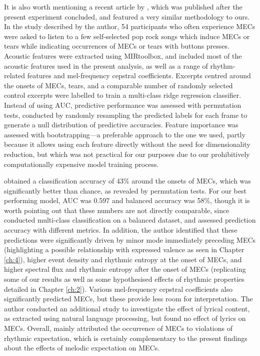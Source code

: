 It is also worth mentioning a recent article by \textcite{mori2022}, which was published after the present experiment concluded, and featured a very similar methodology to ours. In the study described by the author, 54 participants who often experience MECs were asked to listen to a few self-selected pop rock songs which induce MECs or tears while indicating occurrences of MECs or tears with buttons presses. Acoustic features were extracted using MIRtoolbox, and included most of the acoustic features used in the present analysis, as well as a range of rhythm-related features and mel-frequency cepstral coefficients. Excerpts centred around the onsets of MECs, tears, and a comparable number of randomly selected control excerpts were labelled to train a multi-class ridge regression classifier. Instead of using AUC, predictive performance was assessed with permutation tests, conducted by randomly resampling the predicted labels for each frame to generate a null distribution of predictive accuracies. Feature importance was assessed with bootstrapping---a preferable approach to the one we used, partly because it allows using each feature directly without the need for dimensionality reduction, but which was not practical for our purposes due to our prohibitively computationally expensive model training process.

\textcite{mori2022} obtained a classification accuracy of 43\% around the onsets of MECs, which was significantly better than chance, as revealed by permutation tests. For our best performing model, AUC was 0.597 and balanced accuracy was 58\%, though it is worth pointing out that these numbers are not directly comparable, since \textcite{mori2022} conducted multi-class classification on a balanced dataset, and assessed prediction accuracy with different metrics. In addition, the author identified that these predictions were significantly driven by minor mode immediately preceding MECs (highlighting a possible relationship with expressed valence as seen in Chapter \ref{ch:4}), higher event density and rhythmic entropy at the onset of MECs, and higher spectral flux and rhythmic entropy after the onset of MECs (replicating some of our results as well as some hypothesised effects of rhythmic properties detailed in Chapter \ref{ch:2}). Various mel-frequency cepstral coefficients also significantly predicted MECs, but these provide less room for interpretation. The author conducted an additional study to investigate the effect of lyrical content, as extracted using natural language processing, but found no effect of lyrics on MECs. Overall, \textcite{mori2022} mainly attributed the occurrence of MECs to violations of rhythmic expectation, which is certainly complementary to the present findings about the effects of melodic expectation on MECs.

